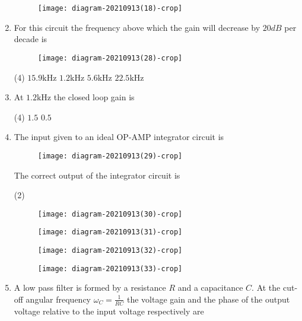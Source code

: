 \begin{enumerate}
\begin{tasks}
\begin{figure}[H]
 			\texttt{[image: diagram-20210913(18)-crop]}
 		\end{figure}
 	\end{tasks}
 	\item For this circuit the frequency above which the gain will decrease by $20 d B$ per decade is
 	{	}
 	\begin{figure}[H]
 		\centering
 		\texttt{[image: diagram-20210913(28)-crop]}
 	\end{figure}
 	\begin{tasks}(4)
 		\task[\textbf{A.}] $15.9 \mathrm{kHz}$
 		\task[\textbf{B.}] $1.2 \mathrm{kHz}$
 		\task[\textbf{C.}]  $5.6 \mathrm{kHz}$
 		\task[\textbf{D.}] $22.5 \mathrm{kHz}$
 	\end{tasks}
 	\item At $1.2 \mathrm{kHz}$ the closed loop gain is
 	{}
 	\begin{tasks}(4)
 		\task[\textbf{B.}] $1.5$
 		\task[\textbf{D.}]  $0.5$
 	\end{tasks}
 	\item The input given to an ideal OP-AMP integrator circuit is\\
 	\begin{figure}[H]
 		\centering
 		\texttt{[image: diagram-20210913(29)-crop]}
 	\end{figure}
 	The correct output of the integrator circuit is
 	{	}
 	\begin{tasks}(2)
 		\task[\textbf{A.}] \begin{figure}[H]
 			\centering
 			\texttt{[image: diagram-20210913(30)-crop]}
 		\end{figure}
 		\task[\textbf{B.}] \begin{figure}[H]
 			\centering
 			\texttt{[image: diagram-20210913(31)-crop]}
 		\end{figure}
 		\task[\textbf{C.}] \begin{figure}[H]
 			\centering
 			\texttt{[image: diagram-20210913(32)-crop]}
 		\end{figure}
 		\task[\textbf{D.}] \begin{figure}[H]
 			\centering
 			\texttt{[image: diagram-20210913(33)-crop]}
 		\end{figure}
 	\end{tasks}
 	\item A low pass filter is formed by a resistance $R$ and a capacitance $C .$ At the cut-off angular frequency $\omega_{C}=\frac{1}{R C}$ the voltage gain and the phase of the output voltage relative to the input voltage respectively are

\end{enumerate}
